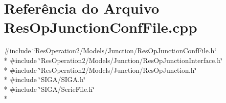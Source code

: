 \section{Referência do Arquivo Res\+Op\+Junction\+Conf\+File.\+cpp}
\label{_res_op_junction_conf_file_8cpp}
{\ttfamily \#include \char`\"{}Res\+Operation2/\+Models/\+Junction/\+Res\+Op\+Junction\+Conf\+File.\+h\char`\"{}}\\*
{\ttfamily \#include \char`\"{}Res\+Operation2/\+Models/\+Junction/\+Res\+Op\+Junction\+Interface.\+h\char`\"{}}\\*
{\ttfamily \#include \char`\"{}Res\+Operation2/\+Models/\+Junction/\+Res\+Op\+Junction.\+h\char`\"{}}\\*
{\ttfamily \#include \char`\"{}S\+I\+G\+A/\+S\+I\+G\+A.\+h\char`\"{}}\\*
{\ttfamily \#include \char`\"{}S\+I\+G\+A/\+Serie\+File.\+h\char`\"{}}\\*
